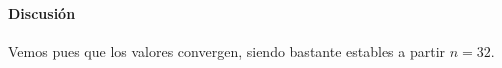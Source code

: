 \begin{table}[htbp]
	\centering
\end{table}

\paragraph{Discusión}

Vemos pues que los valores convergen, siendo bastante estables a partir $n = 32$.
